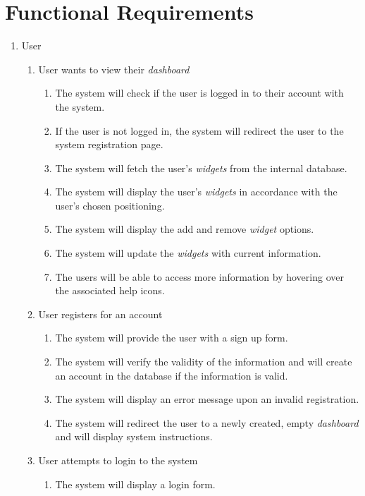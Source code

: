 \documentclass{article}
\begin{document}
\section{Functional Requirements}
\label{sec:functional_requirements}
\begin{enumerate}[{VP}1]
    \item User
    \begin{enumerate}[{BE}1]
        \item User wants to view their \textit{dashboard}
        \begin{enumerate}
            \item The system will check if the user is logged in to their account with the system.
			\item If the user is not logged in, the system will redirect the user to the system registration page.
			\item The system will fetch the user's \textit{widgets} from the internal database.
			\item The system will display the user's  \textit{widgets} in accordance with the user's chosen positioning.
			\item The system will display the add and remove \textit{widget} options.
			\item The system will update the \textit{widgets} with current information.
			\item The users will be able to access more information by hovering over the associated help icons.
        \end{enumerate}
        \item User registers for an account
		\begin{enumerate}
			\item The system will provide the user with a sign up form.
			\item The system will verify the validity of the information and will create an account in the database if the information is valid.   
			\item The system will display an error message upon an invalid registration.
			\item The system will redirect the user to a newly created, empty \textit{dashboard} and will display system instructions.
        \end{enumerate}
        \item User attempts to login to the system
		\begin{enumerate}
			\item The system will display a login form.

\end{enumerate}
\end{enumerate}
\end{enumerate}
\end{document}
